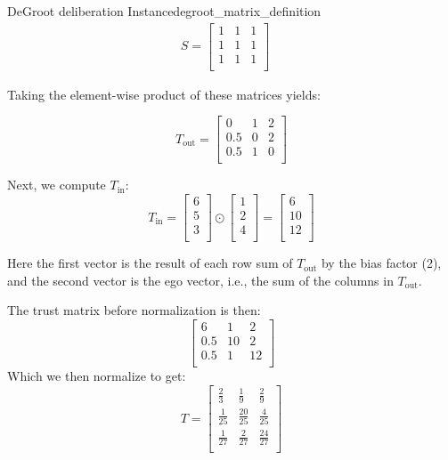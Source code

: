 \begin{example}{DeGroot deliberation Instance}{degroot_matrix_definition}
	\begin{align}
		S = \begin{bmatrix}
			    1 & 1 & 1 \\
			    1 & 1 & 1 \\
			    1 & 1 & 1 \\
		    \end{bmatrix}\quad
	\end{align}

	Taking the element-wise product of these matrices yields:

	$$T_{\text{out}} = \begin{bmatrix}
			0   & 1 & 2 \\
			0.5 & 0 & 2 \\
			0.5 & 1 & 0 \\
		\end{bmatrix}$$

	Next, we compute $T_{\text{in}}$:
	$$T_{\text{in}} = \begin{bmatrix}
			6 \\
			5 \\
			3 \\
		\end{bmatrix} \odot
		\begin{bmatrix}
			1 \\
			2 \\
			4 \\
		\end{bmatrix} = \begin{bmatrix}
			6  \\
			10 \\
			12 \\
		\end{bmatrix} $$

	Here the first vector is the result of each row sum of $T_{\text{out}}$ by the bias factor (2), and the second vector is the ego vector, i.e., the sum of the columns in $T_{\text{out}}$.

	The trust matrix before normalization is then:
	$$\begin{bmatrix}
			6   & 1  & 2  \\
			0.5 & 10 & 2  \\
			0.5 & 1  & 12 \\
		\end{bmatrix}$$
	Which we then normalize to get:
	$$T = \begin{bmatrix}
			\frac{2}{3}  & \frac{1}{9}   & \frac{2}{9}   \\
			\frac{1}{25} & \frac{20}{25} & \frac{4}{25}  \\
			\frac{1}{27} & \frac{2}{27}  & \frac{24}{27} \\
		\end{bmatrix}
	$$
\end{example}




